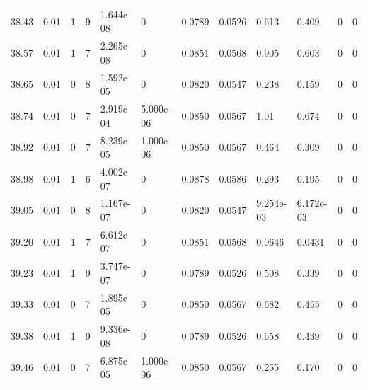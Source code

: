 \documentclass[preview]{standalone}
\begin{document}
{{{{{{{{{{\begin{tabular}{L{1.2cm}C{1.2cm} C{0.3cm}C{0.5cm} C{1.4cm}C{1.4cm} C{1.4cm}C{1.4cm} C{1.6cm}C{1.6cm} C{1.6cm}C{1.6cm}}
  38.43  &  0.01  & 1     &  9 &  1.644e-08  & 0  &  0.0789&   0.0526& 0.613 & 0.409   &  0 & 0  \\ 
  38.57  &  0.01  & 1     &  7 &  2.265e-08  & 0  &  0.0851&   0.0568& 0.905 & 0.603   &  0 & 0  \\ 
  38.65  &  0.01  & 0     &  8 &  1.592e-05  & 0  &  0.0820&   0.0547& 0.238 & 0.159   &  0 & 0  \\ 
  38.74  &  0.01  & 0     &  7 &  2.919e-04  & 5.000e-06  &  0.0850&   0.0567& 1.01 & 0.674   &  0 & 0  \\ 
  38.92  &  0.01  & 0     &  7 &  8.239e-05  & 1.000e-06  &  0.0850&   0.0567& 0.464 & 0.309   &  0 & 0  \\ 
  38.98  &  0.01  & 1     &  6 &  4.002e-07  & 0  &  0.0878&   0.0586& 0.293 & 0.195   &  0 & 0  \\ 
  39.05  &  0.01  & 0     &  8 &  1.167e-07  & 0  &  0.0820&   0.0547& 9.254e-03 & 6.172e-03   &  0 & 0  \\ 
  39.20  &  0.01  & 1     &  7 &  6.612e-07  & 0  &  0.0851&   0.0568& 0.0646 & 0.0431   &  0 & 0  \\ 
  39.23  &  0.01  & 1     &  9 &  3.747e-07  & 0  &  0.0789&   0.0526& 0.508 & 0.339   &  0 & 0  \\ 
  39.33  &  0.01  & 0     &  7 &  1.895e-05  & 0  &  0.0850&   0.0567& 0.682 & 0.455   &  0 & 0  \\ 
  39.38  &  0.01  & 1     &  9 &  9.336e-08  & 0  &  0.0789&   0.0526& 0.658 & 0.439   &  0 & 0  \\ 
  39.46  &  0.01  & 0     &  7 &  6.875e-05  & 1.000e-06  &  0.0850&   0.0567& 0.255 & 0.170   &  0 & 0  \\ 
\hline 
\end{tabular} 

}}}}}}}}}}
\end{document}
